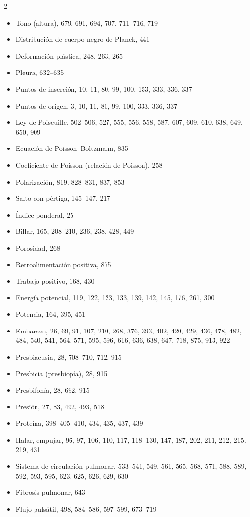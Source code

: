 \documentclass[12pt,a4paper]{book}
\begin{document}
\begin{multicols}{2}
\begin{itemize}[leftmargin=*]
  \item Tono (altura), 679, 691, 694, 707, 711--716, 719
  \item Distribución de cuerpo negro de Planck, 441
  \item Deformación plástica, 248, 263, 265
  \item Pleura, 632--635
  \item Puntos de inserción, 10, 11, 80, 99, 100, 153, 333, 336, 337
  \item Puntos de origen, 3, 10, 11, 80, 99, 100, 333, 336, 337
  \item Ley de Poiseuille, 502--506, 527, 555, 556, 558, 587, 607, 609, 610, 638, 649, 650, 909
  \item Ecuación de Poisson--Boltzmann, 835
  \item Coeficiente de Poisson (relación de Poisson), 258
  \item Polarización, 819, 828--831, 837, 853
  \item Salto con pértiga, 145--147, 217
  \item Índice ponderal, 25
  \item Billar, 165, 208--210, 236, 238, 428, 449
  \item Porosidad, 268
  \item Retroalimentación positiva, 875
  \item Trabajo positivo, 168, 430
  \item Energía potencial, 119, 122, 123, 133, 139, 142, 145, 176, 261, 300
  \item Potencia, 164, 395, 451
  \item Embarazo, 26, 69, 91, 107, 210, 268, 376, 393, 402, 420, 429, 436, 478, 482, 484, 540, 541, 564, 571, 595, 596, 616, 636, 638, 647, 718, 875, 913, 922
  \item Presbiacusia, 28, 708--710, 712, 915
  \item Presbicia (presbiopía), 28, 915
  \item Presbifonía, 28, 692, 915
  \item Presión, 27, 83, 492, 493, 518
  \item Proteína, 398--405, 410, 434, 435, 437, 439
  \item Halar, empujar, 96, 97, 106, 110, 117, 118, 130, 147, 187, 202, 211, 212, 215, 219, 431
  \item Sistema de circulación pulmonar, 533--541, 549, 561, 565, 568, 571, 588, 589, 592, 593, 595, 623, 625, 626, 629, 630
  \item Fibrosis pulmonar, 643
  \item Flujo pulsátil, 498, 584--586, 597--599, 673, 719

\end{itemize}
\end{multicols}
\end{document}
